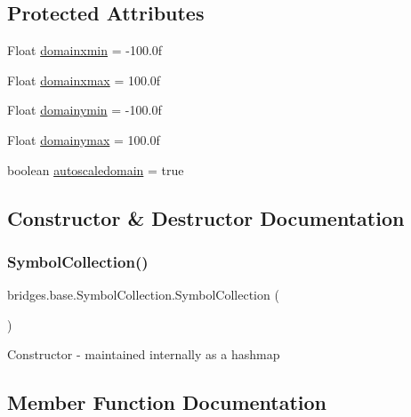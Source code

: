 \subsection*{Protected Attributes}
\begin{DoxyCompactItemize}
\item 
Float \hyperlink{classbridges_1_1base_1_1_symbol_collection_a808f462a3da6890685739ea62e87abae}{domainxmin} = -\/100.\+0f
\item 
Float \hyperlink{classbridges_1_1base_1_1_symbol_collection_a1b65abde241d7659588601d919670cd2}{domainxmax} = 100.\+0f
\item 
Float \hyperlink{classbridges_1_1base_1_1_symbol_collection_a38859e6dad1904650267a0a32d49e65f}{domainymin} = -\/100.\+0f
\item 
Float \hyperlink{classbridges_1_1base_1_1_symbol_collection_acd92edee421384e0c044a67145df8a8b}{domainymax} = 100.\+0f
\item 
boolean \hyperlink{classbridges_1_1base_1_1_symbol_collection_ab7f055b5525eda8fc4056244999c739d}{autoscaledomain} = true
\end{DoxyCompactItemize}


\subsection{Constructor \& Destructor Documentation}
\mbox{\label{classbridges_1_1base_1_1_symbol_collection_a8959dab963ce54f56560c6c27a3a3de5}} 
\subsubsection{\texorpdfstring{Symbol\+Collection()}{SymbolCollection()}}
{\footnotesize\ttfamily bridges.\+base.\+Symbol\+Collection.\+Symbol\+Collection (\begin{DoxyParamCaption}{ }\end{DoxyParamCaption})}

Constructor -\/ maintained internally as a hashmap 

\subsection{Member Function Documentation}
\mbox{\label{classbridges_1_1base_1_1_symbol_collection_a8e934c53b78b05a7e982f3ff2362adea}} 

